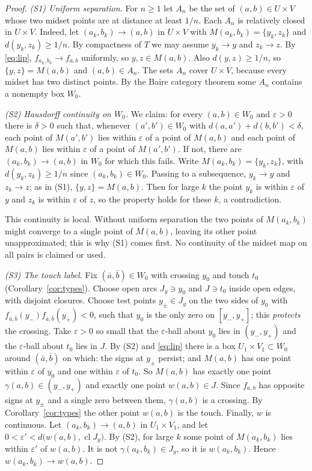 \documentclass[11pt]{amsart}
\theoremstyle{definition}
\theoremstyle{remark}
\newcommand{\M}{M}
\newcommand{\cl}{\operatorname{cl}}
\begin{document}
\begin{proof}
\emph{(S1) Uniform separation.} For $n\ge1$ let $A_n$ be the set of $(a,b)\in U\times V$ whose two midset points are at distance at least $1/n$. Each $A_n$ is relatively closed in $U\times V$. Indeed, let $(a_k,b_k)\to(a,b)$ in $U\times V$ with $\M(a_k,b_k)=\{y_k,z_k\}$ and $d(y_k,z_k)\ge1/n$. By compactness of $T$ we may assume $y_k\to y$ and $z_k\to z$. By \eqref{eq:lip}, $f_{a_k,b_k}\to f_{a,b}$ uniformly, so $y,z\in\M(a,b)$. Also $d(y,z)\ge1/n$, so $\{y,z\}=\M(a,b)$ and $(a,b)\in A_n$. The sets $A_n$ cover $U\times V$, because every midset has two distinct points. By the Baire category theorem some $A_n$ contains a nonempty box $W_0$.

\emph{(S2) Hausdorff continuity on $W_0$.} We claim: for every $(a,b)\in W_0$ and $\varepsilon>0$ there is $\delta>0$ such that, whenever $(a',b')\in W_0$ with $d(a,a')+d(b,b')<\delta$, each point of $\M(a',b')$ lies within $\varepsilon$ of a point of $\M(a,b)$ and each point of $\M(a,b)$ lies within $\varepsilon$ of a point of $\M(a',b')$. If not, there are $(a_k,b_k)\to(a,b)$ in $W_0$ for which this fails. Write $\M(a_k,b_k)=\{y_k,z_k\}$, with $d(y_k,z_k)\ge1/n$ since $(a_k,b_k)\in W_0$. Passing to a subsequence, $y_k\to y$ and $z_k\to z$; as in (S1), $\{y,z\}=\M(a,b)$. Then for large $k$ the point $y_k$ is within $\varepsilon$ of $y$ and $z_k$ is within $\varepsilon$ of $z$, so the property holds for these $k$, a contradiction.

This continuity is local. Without uniform separation the two points of $\M(a_k,b_k)$ might converge to a single point of $\M(a,b)$, leaving its other point unapproximated; this is why (S1) comes first. No continuity of the midset map on all pairs is claimed or used.

\emph{(S3) The touch label.} Fix $(\bar a,\bar b)\in W_0$ with crossing $y_0$ and touch $t_0$ (Corollary~\ref{cor:types}). Choose open arcs $J_y\ni y_0$ and $J\ni t_0$ inside open edges, with disjoint closures. Choose test points $y_\pm\in J_y$ on the two sides of $y_0$ with $f_{\bar a,\bar b}(y_-)f_{\bar a,\bar b}(y_+)<0$, such that $y_0$ is the only zero on $[y_-,y_+]$; this \emph{protects} the crossing. Take $\varepsilon>0$ so small that the $\varepsilon$-ball about $y_0$ lies in $(y_-,y_+)$ and the $\varepsilon$-ball about $t_0$ lies in $J$. By (S2) and \eqref{eq:lip} there is a box $U_1\times V_1\subset W_0$ around $(\bar a,\bar b)$ on which: the signs at $y_\pm$ persist; and $\M(a,b)$ has one point within $\varepsilon$ of $y_0$ and one within $\varepsilon$ of $t_0$. So $\M(a,b)$ has exactly one point $\gamma(a,b)\in(y_-,y_+)$ and exactly one point $w(a,b)\in J$. Since $f_{a,b}$ has opposite signs at $y_\pm$ and a single zero between them, $\gamma(a,b)$ is a crossing. By Corollary~\ref{cor:types} the other point $w(a,b)$ is the touch. Finally, $w$ is continuous. Let $(a_k,b_k)\to(a,b)$ in $U_1\times V_1$, and let $0<\varepsilon'<d\bigl(w(a,b),\cl J_y\bigr)$. By (S2), for large $k$ some point of $\M(a_k,b_k)$ lies within $\varepsilon'$ of $w(a,b)$. It is not $\gamma(a_k,b_k)\in J_y$, so it is $w(a_k,b_k)$. Hence $w(a_k,b_k)\to w(a,b)$.
\end{proof}
\end{document}
